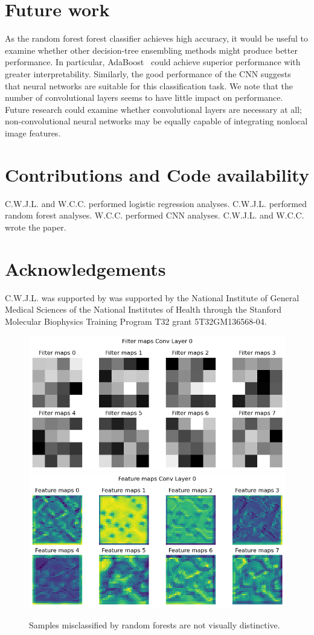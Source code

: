 \documentclass[nofootinbib,pre,superscriptaddress,twocolumn,longbibliography,floatfix]{revtex4-2}
\begin{document}
\section{Future work}
As the random forest forest classifier achieves high accuracy, it would be useful to examine whether other decision-tree ensembling methods might produce better performance.
In particular, AdaBoost~\cite{adaboost} could achieve superior performance with greater interpretability.
Similarly, the good performance of the CNN suggests that neural networks are suitable for this classification task.
We note that the number of convolutional layers seems to have little impact on performance.
Future research could examine whether convolutional layers are necessary at all;
non-convolutional neural networks may be equally capable of integrating nonlocal image features.

\section{Contributions and Code availability}
C.W.J.L. and W.C.C. performed logistic regression analyses.
C.W.J.L. performed random forest analyses.
W.C.C. performed CNN analyses.
C.W.J.L. and W.C.C. wrote the paper.

\section{Acknowledgements}
C.W.J.L. was supported by was supported by the National Institute of General Medical Sciences of the National Institutes of Health through the Stanford Molecular Biophysics Training Program T32 grant 5T32GM136568-04.

\begin{figure}[h!]
    \centering
    \includegraphics[width=1.0\linewidth]{../figures/D.png}
    \includegraphics[width=1.0\linewidth]{../figures/C.png}
    \caption{Samples misclassified by random forests are not visually distinctive.}
    \label{fig:kernels}
\end{figure}


\end{document}
